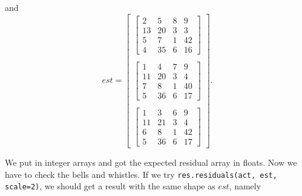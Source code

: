 \documentclass{article}
\begin{document}
and
\[est=\left[\begin{array}{c}

    \left[\begin{array}{cccc}
      2 & 5 & 8 & 9 \\
      13 & 20 & 3 & 3 \\
      5 & 7 & 1 & 42 \\
      4 & 35 & 6 & 16
    \end{array} \right] \\

  \\

  \left[\begin{array}{cccc}
      1 & 4 & 7 & 9 \\
      11 & 20 & 3 & 4 \\
      7 & 8 & 1 & 40 \\
      5 & 36 & 6 & 17
    \end{array} \right] \\

  \\

  \left[\begin{array}{cccc}
      1 & 3 & 6 & 9 \\
      11 & 21 & 3 & 4 \\
      6 & 8 & 1 & 42 \\
      5 & 36 & 6 & 17
    \end{array} \right]

\end{array}\right].\]


We put in integer arrays and got the expected residual array in
floats.  Now we have to check the bells and whistles.  If we try
\verb|res.residuals(act, est, scale=2)|, we should get a result with
the same shape as $est$, namely
\end{document}
